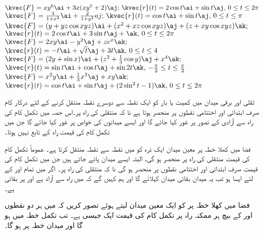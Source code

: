 \(\kvec{F}=xy^6\ai+3x(xy^5+2)\aj;\, \kvec{r}(t)=2\cos t\ai+\sin t\aj,\, 0\le t\le 2\pi\)
\(\kvec{F}=\tfrac{3}{1+x^2}\ai+\tfrac{2}{1+y^2}aj;\, \kvec{r}(t)=\cos t\ai+\sin t\aj,\, 0\le t\le \pi\)
\(\kvec{F}=(y+yz\cos xyz)\ai+(x^2+xz\cos xyz)\aj+(z+xy\cos xyz)\ak;\)\\
\( \kvec{r}(t)=2\cos t\ai+3\sin t\aj+\ak,\, 0\le t\le 2\pi\)
\(\kvec{F}=2xy\ai-y^2\aj+ze^x\ak;\)\\
\( \kvec{r}(t)=-t\ai+\sqrt{t}\aj+3t\ak,\, 0\le t\le 4\)
\(\kvec{F}=(2y+\sin x)\ai+(z^2+\tfrac{1}{3}\cos y)\aj+x^4\ak;\)\\
\( \kvec{r}(t)=\sin t \ai+\cos t\aj+\sin 2t\ak,\, -\tfrac{\pi}{2}\le t\le \tfrac{\pi}{2}\)
\(\kvec{F}=x^2y\ai+\tfrac{1}{3}x^3\aj+xy\ak;\)\\
\( \kvec{r}(t)=\cos t\ai+\sin t\aj+(2\sin^2 t-1)\ak,\, 0\le t\le 2\pi\)

ثقلی اور برقی میدان میں کمیت یا بار کو ایک نقطہ سے دوسرے نقطہ منتقل کرنے کے لئے درکار کام صرف ابتدائی اور اختتامی نقطوں پر منحصر ہوتا ہے نا کہ منتقلی کی راہ پر۔اس حصہ میں تکمل کام کی راہ سے آزادی کے تصور پر غور کیا جائے گا اور ایسے میدانوں کی خواص پر غور کیا جائے گا جن میں تکمل کام کی قیمت راہ کے تابع نہیں ہوتا۔

فضا میں کھلا خطہ  پر معین میدان  ایک ذرہ کو  میں  نقطہ  سے نقطہ  منتقل کرتا ہے۔ عموماً   تکمل کام  کی قیمت منتقلی کی راہ پر منحصر ہو گی، البتہ ایسے میدان پائے جاتے ہیں جن میں تکمل کام کی قیمت صرف ابتدائی اور اختتامی نقطوں پر منحصر ہو گی نا کہ منتقلی کی راہ پر۔ اگر  میں تمام  اور  کے لئے ایسا ہو تب یہ میدان بقائی میدان کہلائے گا اور ہم کہیں گے کہ  میں  راہ سے آزاد ہے اور  پر  بقائی ہے۔

فضا میں کھلا خطہ  پر  کو ایک  معین میدان لیتے ہوئے تصور کریں کہ  میں ہر دو نقطوں  اور  کے بیچ ہر ممکنہ راہ پر تکمل کام  کی قیمت ایک جیسی ہے۔ تب تکمل  خطہ  میں  ہو گا اور میدان  خطہ  پر  ہو گا۔

